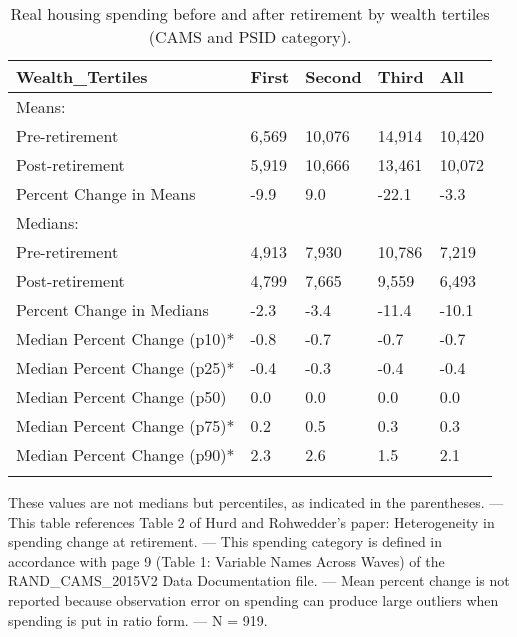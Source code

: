 \begin{table}[tbp] \centering
{}

\caption{Real housing spending before and after retirement by wealth tertiles (CAMS and PSID category).}
\begin{tabularx}{\textwidth}{lCCCC}

\toprule
{Wealth\_Tertiles}&{First}&{Second}&{Third}&{All} \tabularnewline
\midrule\addlinespace[1.5ex]
Means:&&&& \tabularnewline
\midrule Pre-retirement&6,569&10,076&14,914&10,420 \tabularnewline
Post-retirement&5,919&10,666&13,461&10,072 \tabularnewline
Percent Change in Means&-9.9&9.0&-22.1&-3.3 \tabularnewline
\midrule Medians:&&&& \tabularnewline
\midrule Pre-retirement&4,913&7,930&10,786&7,219 \tabularnewline
Post-retirement&4,799&7,665&9,559&6,493 \tabularnewline
Percent Change in Medians&-2.3&-3.4&-11.4&-10.1 \tabularnewline
Median Percent Change (p10)*&-0.8&-0.7&-0.7&-0.7 \tabularnewline
Median Percent Change (p25)*&-0.4&-0.3&-0.4&-0.4 \tabularnewline
Median Percent Change (p50)&0.0&0.0&0.0&0.0 \tabularnewline
Median Percent Change (p75)*&0.2&0.5&0.3&0.3 \tabularnewline
Median Percent Change (p90)*&2.3&2.6&1.5&2.1 \tabularnewline
\bottomrule \addlinespace[1.5ex]

\end{tabularx}
\begin{flushleft}
\footnotesize *These values are not medians but percentiles, as indicated in the parentheses. \linebreak --- \linebreak This table references Table 2 of Hurd and Rohwedder's paper: Heterogeneity in spending change at retirement. \linebreak --- \linebreak This spending category is defined in accordance with page 9 (Table 1: Variable Names Across Waves) of the RAND\_CAMS\_2015V2 Data Documentation file. \linebreak --- \linebreak Mean percent change is not reported because observation error on spending can produce large outliers when spending is put in ratio form. \linebreak --- \linebreak N = 919.
\end{flushleft}
\end{table}
